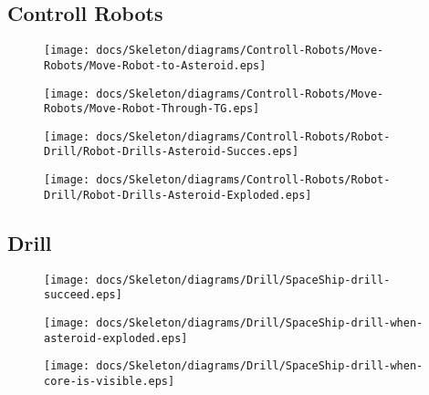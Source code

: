 
\subsection{Controll Robots}

\begin{figure}[H] 
    \centering 
    \texttt{[image: docs/Skeleton/diagrams/Controll-Robots/Move-Robots/Move-Robot-to-Asteroid.eps]} 
    \caption{} 
\end{figure} 

\begin{figure}[H] 
    \centering 
    \texttt{[image: docs/Skeleton/diagrams/Controll-Robots/Move-Robots/Move-Robot-Through-TG.eps]} 
    \caption{} 
\end{figure} 


\begin{figure}[H] 
    \centering 
    \texttt{[image: docs/Skeleton/diagrams/Controll-Robots/Robot-Drill/Robot-Drills-Asteroid-Succes.eps]} 
    \caption{} 
\end{figure} 

\begin{figure}[H] 
    \centering 
    \texttt{[image: docs/Skeleton/diagrams/Controll-Robots/Robot-Drill/Robot-Drills-Asteroid-Exploded.eps]} 
    \caption{} 
\end{figure} 



\subsection{Drill}

\begin{figure}[H] 
    \centering 
    \texttt{[image: docs/Skeleton/diagrams/Drill/SpaceShip-drill-succeed.eps]} 
    \caption{} 
\end{figure} 

\begin{figure}[H] 
    \centering 
    \texttt{[image: docs/Skeleton/diagrams/Drill/SpaceShip-drill-when-asteroid-exploded.eps]} 
    \caption{} 
\end{figure} 

\begin{figure}[H] 
    \centering 
    \texttt{[image: docs/Skeleton/diagrams/Drill/SpaceShip-drill-when-core-is-visible.eps]} 
    \caption{} 
\end{figure} 

